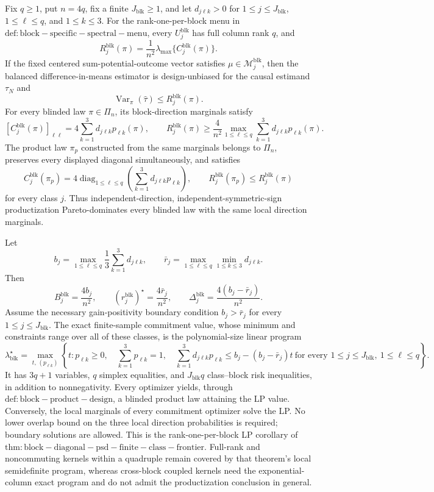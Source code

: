 Fix \(q\ge1\), put \(n=4q\), fix a finite \(J_{\mathrm{blk}}\ge1\), and let \(d_{j\ell k}>0\) for \(1\le j\le J_{\mathrm{blk}}\), \(1\le\ell\le q\), and \(1\le k\le3\). For the rank-one-per-block menu in \(\mathrm{def:block-specific-spectral-menu}\), every \(U_j^{\mathrm{blk}}\) has full column rank \(q\), and
\[
R_j^{\mathrm{blk}}(\pi)
=\frac1{n^2}\lambda_{\max}\{C_j^{\mathrm{blk}}(\pi)\}.
\]
If the fixed centered sum-potential-outcome vector satisfies \(\mu\in\mathcal M_j^{\mathrm{blk}}\), then the balanced difference-in-means estimator is design-unbiased for the causal estimand \(\tau_N\) and
\[
\operatorname{Var}_\pi(\widehat\tau)\le R_j^{\mathrm{blk}}(\pi).
\]
For every blinded law \(\pi\in\Pi_n\), its block-direction marginals satisfy
\[
[C_j^{\mathrm{blk}}(\pi)]_{\ell\ell}
=4\sum_{k=1}^3d_{j\ell k}p_{\ell k}(\pi),
\qquad
R_j^{\mathrm{blk}}(\pi)
\ge\frac4{n^2}\max_{1\le\ell\le q}
\sum_{k=1}^3d_{j\ell k}p_{\ell k}(\pi).
\]
The product law \(\pi_p\) constructed from the same marginals belongs to \(\Pi_n\), preserves every displayed diagonal simultaneously, and satisfies
\[
C_j^{\mathrm{blk}}(\pi_p)
=4\operatorname{diag}_{1\le\ell\le q}
\left(\sum_{k=1}^3d_{j\ell k}p_{\ell k}\right),
\qquad
R_j^{\mathrm{blk}}(\pi_p)\le R_j^{\mathrm{blk}}(\pi)
\]
for every class \(j\). Thus independent-direction, independent-symmetric-sign productization Pareto-dominates every blinded law with the same local direction marginals.

Let
\[
b_j=\max_{1\le\ell\le q}\frac13\sum_{k=1}^3d_{j\ell k},
\qquad
\bar r_j=\max_{1\le\ell\le q}\min_{1\le k\le3}d_{j\ell k}.
\]
Then
\[
B_j^{\mathrm{blk}}=\frac{4b_j}{n^2},
\qquad
(r_j^{\mathrm{blk}})^\star=\frac{4\bar r_j}{n^2},
\qquad
\Delta_j^{\mathrm{blk}}=\frac{4(b_j-\bar r_j)}{n^2}.
\]
Assume the necessary gain-positivity boundary condition \(b_j>\bar r_j\) for every \(1\le j\le J_{\mathrm{blk}}\). The exact finite-sample commitment value, whose minimum and constraints range over all of these classes, is the polynomial-size linear program
\[
\boxed{
\lambda_{\mathrm{blk}}^\star
=\max_{t,\,(p_{\ell k})}
\left\{t:
p_{\ell k}\ge0,\quad
\sum_{k=1}^3p_{\ell k}=1,\quad
\sum_{k=1}^3d_{j\ell k}p_{\ell k}
\le b_j-(b_j-\bar r_j)t
\ \text{for every }1\le j\le J_{\mathrm{blk}},\ 1\le\ell\le q
\right\}.}
\]
It has \(3q+1\) variables, \(q\) simplex equalities, and \(J_{\mathrm{blk}}q\) class--block risk inequalities, in addition to nonnegativity. Every optimizer yields, through \(\mathrm{def:block-product-design}\), a blinded product law attaining the LP value. Conversely, the local marginals of every commitment optimizer solve the LP. No lower overlap bound on the three local direction probabilities is required; boundary solutions are allowed. This is the rank-one-per-block LP corollary of \(\mathrm{thm:block-diagonal-psd-finite-class-frontier}\). Full-rank and noncommuting kernels within a quadruple remain covered by that theorem's local semidefinite program, whereas cross-block coupled kernels need the exponential-column exact program and do not admit the productization conclusion in general.